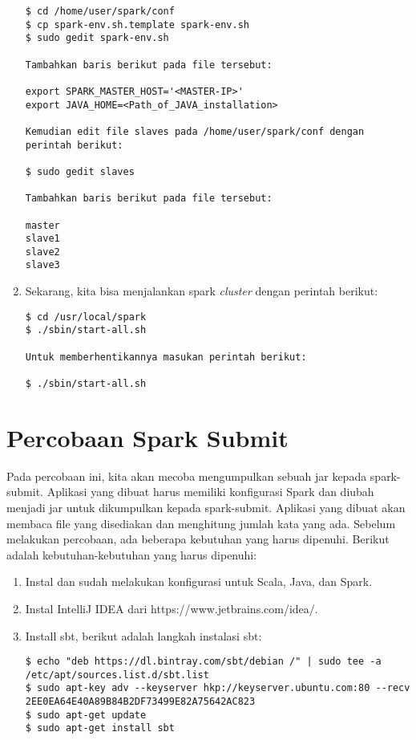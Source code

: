 \begin{enumerate}
\begin{verbatim}
$ cd /home/user/spark/conf
$ cp spark-env.sh.template spark-env.sh
$ sudo gedit spark-env.sh

Tambahkan baris berikut pada file tersebut:

export SPARK_MASTER_HOST='<MASTER-IP>'
export JAVA_HOME=<Path_of_JAVA_installation>

Kemudian edit file slaves pada /home/user/spark/conf dengan perintah berikut:

$ sudo gedit slaves

Tambahkan baris berikut pada file tersebut:

master
slave1
slave2
slave3
\end{verbatim}

\item Sekarang, kita bisa menjalankan spark \textit{cluster} dengan perintah berikut:

\begin{verbatim}
$ cd /usr/local/spark
$ ./sbin/start-all.sh

Untuk memberhentikannya masukan perintah berikut:

$ ./sbin/start-all.sh
\end{verbatim}


\end{enumerate}

\section{Percobaan Spark Submit}

Pada percobaan ini, kita akan mecoba mengumpulkan sebuah jar kepada spark-submit. Aplikasi yang dibuat harus memiliki konfigurasi Spark dan diubah menjadi jar untuk dikumpulkan kepada spark-submit. Aplikasi yang dibuat akan membaca file yang disediakan dan menghitung jumlah kata yang ada. Sebelum melakukan percobaan, ada beberapa kebutuhan yang harus dipenuhi. Berikut adalah kebutuhan-kebutuhan yang harus dipenuhi:

\begin{enumerate}

\item Instal dan sudah melakukan konfigurasi untuk Scala, Java, dan Spark.

\item Instal IntelliJ IDEA dari https://www.jetbrains.com/idea/.

\item Install sbt, berikut adalah langkah instalasi sbt:

\begin{verbatim}
$ echo "deb https://dl.bintray.com/sbt/debian /" | sudo tee -a /etc/apt/sources.list.d/sbt.list
$ sudo apt-key adv --keyserver hkp://keyserver.ubuntu.com:80 --recv 2EE0EA64E40A89B84B2DF73499E82A75642AC823
$ sudo apt-get update
$ sudo apt-get install sbt
\end{verbatim}


\end{enumerate}

